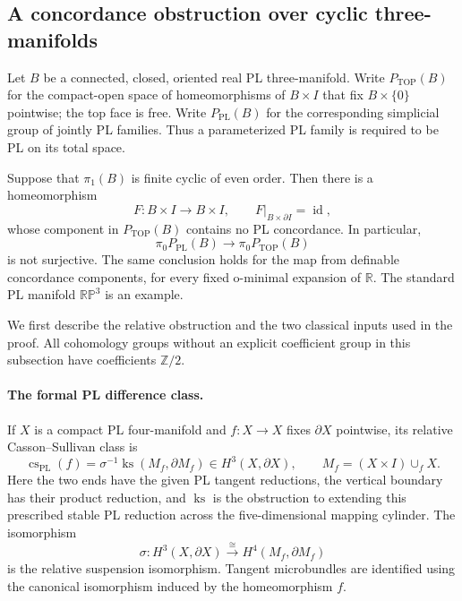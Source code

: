 \subsection{A concordance obstruction over cyclic three-manifolds}

Let $B$ be a connected, closed, oriented real PL three-manifold.
Write $P_{\mathrm{TOP}}(B)$ for the compact-open space of
homeomorphisms of $B\times I$ that fix $B\times\{0\}$ pointwise;
the top face is free.  Write $P_{\mathrm{PL}}(B)$ for the corresponding
simplicial group of jointly PL families.  Thus a parameterized PL
family is required to be PL on its total space.

\begin{theorem}\label{thm:cyclic-three-concordance-obstruction}
Suppose that $\pi_1(B)$ is finite cyclic of even order.  Then there
is a homeomorphism
\[
 F:B\times I\longrightarrow B\times I,
 \qquad F|_{B\times\partial I}=\operatorname{id},
\]
whose component in $P_{\mathrm{TOP}}(B)$ contains no PL
concordance.  In particular,
\[
 \pi_0P_{\mathrm{PL}}(B)\longrightarrow
 \pi_0P_{\mathrm{TOP}}(B)
\]
is not surjective.  The same conclusion holds for the map from
definable concordance components, for every fixed o-minimal
expansion of $\mathbb R$.  The standard PL manifold
$\mathbb {RP}^{3}$ is an example.
\end{theorem}

We first describe the relative obstruction and the two classical
inputs used in the proof.  All cohomology groups without an
explicit coefficient group in this subsection have coefficients
$\mathbb Z/2$.

\paragraph{The formal PL difference class.}
If $X$ is a compact PL four-manifold and $f:X\to X$ fixes
$\partial X$ pointwise, its relative Casson--Sullivan class is
\begin{equation}\label{eq:relative-three-base-cs}
 \operatorname{cs}_{\mathrm{PL}}(f)
 =\sigma^{-1}\operatorname{ks}(M_f,\partial M_f)
 \in H^3(X,\partial X),\qquad
 M_f=(X\times I)\cup_f X.
\end{equation}
Here the two ends have the given PL tangent reductions, the
vertical boundary has their product reduction, and
$\operatorname{ks}$ is the obstruction to extending this
prescribed stable PL reduction across the five-dimensional
mapping cylinder.  The isomorphism
\[
 \sigma:H^3(X,\partial X)\xrightarrow{\cong}
             H^4(M_f,\partial M_f)
\]
is the relative suspension isomorphism.  Tangent microbundles
are identified using the canonical isomorphism induced by the
homeomorphism $f$.

